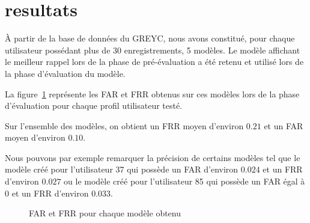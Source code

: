 \section{resultats}

À partir de la base de données du GREYC, nous avons constitué, pour chaque utilisateur possédant plus de 30 enregistrements, 5 modèles. Le modèle affichant le meilleur rappel lors de la phase de pré-évaluation a été retenu et utilisé lors de la phase d'évaluation du modèle.

La figure~\ref{results} représente les FAR et FRR obtenus sur ces modèles lors de la phase d'évaluation pour chaque profil utilisateur testé.

Sur l'ensemble des modèles, on obtient un FRR moyen d'environ $0.21$ et un FAR moyen d'environ $0.10$.

Nous pouvons par exemple remarquer la précision de certains modèles tel que le modèle créé pour l'utilisateur 37 qui possède un FAR d'environ $0.024$ et un FRR d'environ $0.027$ ou le modèle créé pour l'utilisateur 85 qui possède un FAR égal à $0$ et un FRR d'environ $0.033$.


\loadedtable

\begin{figure}
\caption{FAR et FRR pour chaque modèle obtenu}
\label{results}
\end{figure}